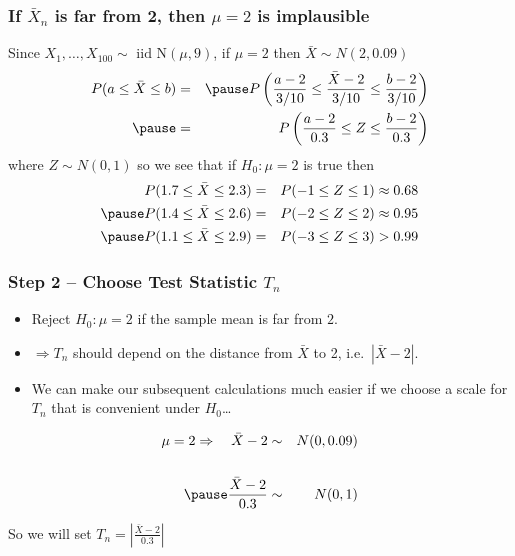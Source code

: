 \begin{frame}
  \frametitle{If $\bar{X}_n$ is far from 2, then $\mu = 2$ is implausible}

  Since $X_1, \dots, X_{100} \sim \mbox{ iid N}(\mu, 9)$, \alert{if $\mu = 2$ then $\bar{X} \sim N(2, 0.09)$}
  \begin{eqnarray*}
     P(a \leq \bar{X} \leq b) &=& \pause P\left(\frac{a - 2}{3/10} \leq \frac{\bar{X}-2}{3/10} \leq \frac{b - 2}{3/10} \right)\\ \pause
     &=& P\left( \frac{a-2}{0.3} \leq Z \leq \frac{b-2}{0.3} \right)
  \end{eqnarray*}
  where $Z \sim N(0,1)$ so we see that if $H_0\colon \mu = 2$ is true then \pause
  \begin{eqnarray*}
    P(1.7 \leq \bar{X} \leq 2.3) &=& P(-1 \leq Z \leq 1) \approx 0.68\\ \pause
    P(1.4 \leq \bar{X} \leq 2.6) &=& P(-2 \leq Z \leq 2) \approx 0.95 \\ \pause
    P(1.1 \leq \bar{X} \leq 2.9) &=& P(-3 \leq Z \leq 3) > 0.99 
  \end{eqnarray*}

\end{frame}
\begin{frame}
  \frametitle{Step 2 -- Choose Test Statistic $T_n$}
  \begin{itemize}
    \item Reject $H_0\colon \mu = 2$ if the sample mean is far from $2$. \pause
    \item $\Rightarrow T_n$ should depend on the \alert{distance} from $\bar{X}$ to 2, i.e.\ $|\bar{X} - 2|$.\pause
    \item We can make our subsequent calculations much easier if we choose a \alert{scale for $T_n$ that is convenient under $H_0$\dots}
  \end{itemize}
  \begin{eqnarray*}
    \mu=2 \Rightarrow \quad \bar{X} - 2 &\sim& N(0, 0.09) \\ \\ \pause
    \frac{\bar{X} - 2}{0.3} &\sim& N(0,1)
  \end{eqnarray*}

  \alert{So we will set $\displaystyle T_n = \left|\frac{\bar{X} - 2}{0.3}\right|$}

\end{frame}
